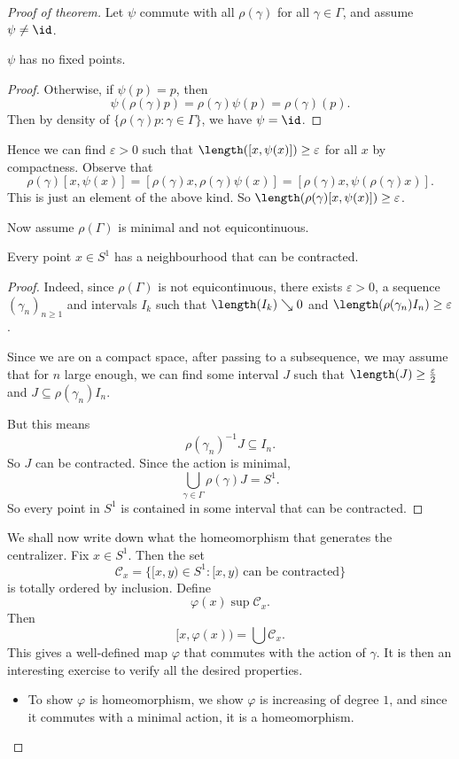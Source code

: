 \documentclass[a4paper]{article}
\begin{document}
\begin{proof}[Proof of theorem]
  Let $\psi$ commute with all $\rho(\gamma)$ for all $\gamma \in \Gamma$, and assume $\psi \not= \id$.
  \begin{claim}
    $\psi$ has no fixed points.
  \end{claim}

  \begin{proof}
    Otherwise, if $\psi(p) = p$, then
    \[
      \psi(\rho(\gamma) p) = \rho(\gamma) \psi(p) = \rho(\gamma)(p).
    \]
    Then by density of $\{\rho(\gamma) p: \gamma \in \Gamma\}$, we have $\psi = \id$.
  \end{proof}

  Hence we can find $\varepsilon > 0$ such that $\length([x, \psi(x)]) \geq \varepsilon$ for all $x$ by compactness. Observe that
  \[
    \rho(\gamma) [x, \psi(x)] = [\rho(\gamma) x, \rho(\gamma) \psi(x)] = [\rho(\gamma) x, \psi(\rho(\gamma)x)].
  \]
  This is just an element of the above kind. So $\length(\rho(\gamma)[x, \psi(x)]) \geq \varepsilon$.

  Now assume $\rho(\Gamma)$ is minimal and not equicontinuous.
  \begin{claim}
    Every point $x \in S^1$ has a neighbourhood that can be contracted.
  \end{claim}

  \begin{proof}
    Indeed, since $\rho(\Gamma)$ is not equicontinuous, there exists $\varepsilon > 0$, a sequence $(\gamma_n)_{n \geq 1}$ and intervals $I_k$ such that $\length(I_k) \searrow 0$ and $\length(\rho(\gamma_n)I_n) \geq \varepsilon$.

    Since we are on a compact space, after passing to a subsequence, we may assume that for $n$ large enough, we can find some interval $J$ such that $\length(J) \geq \frac{\varepsilon}{2}$ and $J \subseteq \rho(\gamma_n) I_n$.

    But this means
    \[
      \rho(\gamma_n)^{-1} J \subseteq I_n.
    \]
    So $J$ can be contracted. Since the action is minimal,
    \[
      \bigcup_{\gamma \in \Gamma} \rho(\gamma) J = S^1.
    \]
    So every point in $S^1$ is contained in some interval that can be contracted.
  \end{proof}

  We shall now write down what the homeomorphism that generates the centralizer. Fix $x \in S^1$. Then the set
  \[
    \mathcal{C}_x = \{[x, y) \in S^1: [x, y)\text{ can be contracted}\}
  \]
  is totally ordered by inclusion. Define
  \[
    \varphi(x) \sup \mathcal{C}_x.
  \]
  Then
  \[
    [x, \varphi(x)) = \bigcup \mathcal{C}_x.
  \]
  This gives a well-defined map $\varphi$ that commutes with the action of $\gamma$. It is then an interesting exercise to verify all the desired properties.
  \begin{itemize}
    \item To show $\varphi$ is homeomorphism, we show $\varphi$ is increasing of degree $1$, and since it commutes with a minimal action, it is a homeomorphism.


\end{itemize}
\end{proof}
\end{document}
